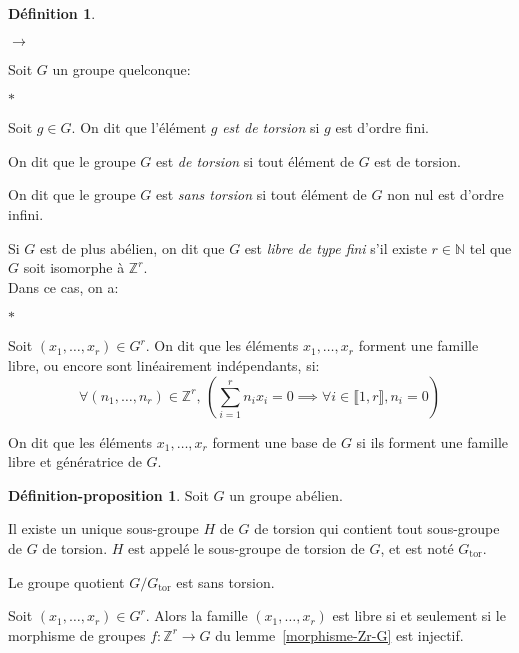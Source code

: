 \documentclass{article}
\newcommand{\Z}{\mathbb{Z}}
\newcommand{\N}{\mathbb{N}}
\newcommand{\Gt}{G_{\mathrm{tor}}}
\newcommand{\dis}{\displaystyle}
\newenvironment{ls}{\begin{list}{$\to$}{}}{\end{list}}
\newenvironment{lls}{\begin{list}{$\ast$}{}}{\end{list}}
\newcommand{\nt}[1]{\llbracket  #1 \rrbracket }
\theoremstyle{definition}
\newtheorem{defi}{Définition}
\newtheorem{depro}{Définition-proposition}
\theoremstyle{remark}
\begin{document}
\begin{defi}\hspace{.1em}
\begin{ls}
\item Soit $G$ un groupe quelconque:
\begin{lls}
\item Soit $g \in G$. On dit que l'élément $g$ \textit{est de torsion} si $g$ est d'ordre fini.
\item On dit que le groupe $G$ est \textit{de torsion} si tout élément de $G$ est de torsion.
\item On dit que le groupe $G$ est \textit{sans torsion} si tout élément de $G$ non nul est d'ordre infini.
\end{lls}

\item Si $G$ est de plus abélien, on dit que $G$ est \textit{libre de type fini} s'il existe $r \in \N$ tel que $G$ soit isomorphe à $\Z^r$.\\
Dans ce cas, on a:
\begin{lls}
\item Soit $(x_1, \ldots, x_r) \in G^r$.  On dit que les éléments $x_1, \ldots, x_r$ forment une famille libre, ou encore sont linéairement indépendants, si:
$$\forall (n_1, \ldots, n_r) \in \Z^r,\, \left(\dis \sum_{i=1}^r n_ix_i=0\implies\forall i \in \nt{1,r}, n_i=0\right)$$
\item On dit que les éléments $x_1, \ldots, x_r$ forment une base de $G$ si ils forment une famille libre et génératrice de $G$.
\end{lls}
\end{ls}
\end{defi}

\begin{depro}\label{def-groupe-torsion}
Soit $G$ un groupe abélien.
\begin{point}
\item Il existe un unique sous-groupe $H$ de $G$ de torsion qui contient tout sous-groupe de $G$ de torsion. $H$ est appelé le sous-groupe de torsion de $G$, et est noté $\Gt$.
\item Le groupe quotient $G/\Gt$ est sans torsion.
\item Soit $(x_1, \ldots, x_r)  \in G^r$. Alors la famille  $(x_1, \ldots, x_r)$ est libre si et seulement si le morphisme de groupes $f:\Z^r\to G$ du lemme~\ref{morphisme-Zr-G} est injectif.
\end{point}
\end{depro}
\end{document}
